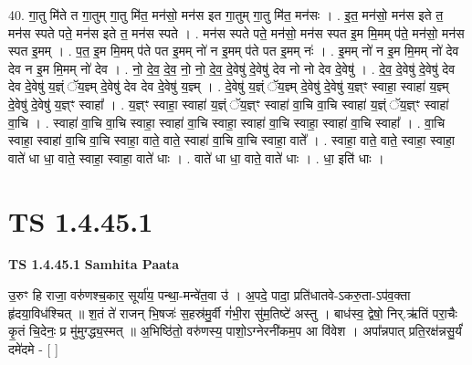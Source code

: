 \documentclass[17pt]{extarticle}
\begin{document}
40. गा॒तु मि॑ते त गा॒तुम् गा॒तु मि॑त॒ मन॑सो॒ मन॑स इत गा॒तुम् गा॒तु मि॑त॒ मन॑सः । . इ॒त॒ मन॑सो॒ मन॑स इते त॒ मन॑स स्पते पते॒ मन॑स इते त॒ मन॑स स्पते । . मन॑स स्पते पते॒ मन॑सो॒ मन॑स स्पत इ॒म मि॒मम् प॑ते॒ मन॑सो॒ मन॑स स्पत इ॒मम् । . प॒त॒ इ॒म मि॒मम् प॑ते पत इ॒मम् नो॑ न इ॒मम् प॑ते पत इ॒मम् नः॑ । . इ॒मम् नो॑ न इ॒म मि॒मम् नो॑ देव देव न इ॒म मि॒मम् नो॑ देव । . नो॒ दे॒व॒ दे॒व॒ नो॒ नो॒ दे॒व॒ दे॒वेषु॑ दे॒वेषु॑ देव नो नो देव दे॒वेषु॑ । . दे॒व॒ दे॒वेषु॑ दे॒वेषु॑ देव देव दे॒वेषु॑ य॒ज्ञ्ं ॅय॒ज्ञ्म् दे॒वेषु॑ देव देव दे॒वेषु॑ य॒ज्ञ्म् । . दे॒वेषु॑ य॒ज्ञ्ं ॅय॒ज्ञ्म् दे॒वेषु॑ दे॒वेषु॑ य॒ज्ञ्ꣳ स्वाहा॒ स्वाहा॑ य॒ज्ञ्म् दे॒वेषु॑ दे॒वेषु॑ य॒ज्ञ्ꣳ स्वाहा᳚ । . य॒ज्ञ्ꣳ स्वाहा॒ स्वाहा॑ य॒ज्ञ्ं ॅय॒ज्ञ्ꣳ स्वाहा॑ वा॒चि वा॒चि स्वाहा॑ य॒ज्ञ्ं ॅय॒ज्ञ्ꣳ स्वाहा॑ वा॒चि । . स्वाहा॑ वा॒चि वा॒चि स्वाहा॒ स्वाहा॑ वा॒चि स्वाहा॒ स्वाहा॑ वा॒चि स्वाहा॒ स्वाहा॑ वा॒चि स्वाहा᳚ । . वा॒चि स्वाहा॒ स्वाहा॑ वा॒चि वा॒चि स्वाहा॒ वाते॒ वाते॒ स्वाहा॑ वा॒चि वा॒चि स्वाहा॒ वाते᳚ । . स्वाहा॒ वाते॒ वाते॒ स्वाहा॒ स्वाहा॒ वाते॑ धा धा॒ वाते॒ स्वाहा॒ स्वाहा॒ वाते॑ धाः । . वाते॑ धा धा॒ वाते॒ वाते॑ धाः । . धा॒ इति॑ धाः । \newline
\pagebreak
{}

\section{ TS 1.4.45.1 }

\textbf{TS 1.4.45.1 } \newline
\textbf{Samhita Paata} \newline

उ॒रुꣳ हि राजा॒ वरु॑णश्च॒कार॒ सूर्या॑य॒ पन्था॒-मन्वे॑त॒वा उ॑ । अ॒पदे॒ पादा॒ प्रति॑धातवे-ऽकरु॒ता-ऽप॑व॒क्ता हृ॑दया॒विध॑श्चित् ॥ श॒तं ते॑ राजन् भि॒षजः॑ स॒हस्र॑मु॒र्वी गं॑भी॒रा सु॑म॒तिष्टे॑ अस्तु । बाध॑स्व॒ द्वेषो॒ निर्.ऋ॑तिं परा॒चैः कृ॒तं चि॒देनः॒ प्र मु॑मुग्द्ध्य॒स्मत् ॥ अ॒भिष्ठि॑तो॒ वरु॑णस्य॒ पाशो॒ऽग्नेरनी॑कम॒प आ वि॑वेश । अपा᳚न्नपात् प्रति॒रक्ष॑न्नसु॒र्यं॑ दमे॑दमे - [ ] \newline
\end{document}
